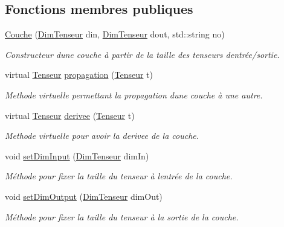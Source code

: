 \subsection*{Fonctions membres publiques}
\begin{DoxyCompactItemize}
\item 
\mbox{\label{class_couche_a6da95828f8c597f57aaac057b9357622}} 
\hyperlink{class_couche_a6da95828f8c597f57aaac057b9357622}{Couche} (\hyperlink{class_dim_tenseur}{Dim\+Tenseur} din, \hyperlink{class_dim_tenseur}{Dim\+Tenseur} dout, std\+::string no)
\begin{DoxyCompactList}\small\item\em Constructeur d\textquotesingle{}une couche à partir de la taille des tenseurs d\textquotesingle{}entrée/sortie. \end{DoxyCompactList}\item 
virtual \hyperlink{class_tenseur}{Tenseur} \hyperlink{class_couche_a1f0ed59e21020f5d4f37933af4d1b1e5}{propagation} (\hyperlink{class_tenseur}{Tenseur} t)
\begin{DoxyCompactList}\small\item\em Methode virtuelle permettant la propagation d\textquotesingle{}une couche à une autre. \end{DoxyCompactList}\item 
virtual \hyperlink{class_tenseur}{Tenseur} \hyperlink{class_couche_acfb65d035c2070d65b699508b7333bb3}{derivee} (\hyperlink{class_tenseur}{Tenseur} t)
\begin{DoxyCompactList}\small\item\em Methode virtuelle pour avoir la derivee de la couche. \end{DoxyCompactList}\item 
void \hyperlink{class_couche_ab24ce01bc6fb7b903013f7682ce60a7e}{set\+Dim\+Input} (\hyperlink{class_dim_tenseur}{Dim\+Tenseur} dim\+In)
\begin{DoxyCompactList}\small\item\em Méthode pour fixer la taille du tenseur à l\textquotesingle{}entrée de la couche. \end{DoxyCompactList}\item 
void \hyperlink{class_couche_a9af2f37eaf1063cb05abe980cfaa4cce}{set\+Dim\+Output} (\hyperlink{class_dim_tenseur}{Dim\+Tenseur} dim\+Out)
\begin{DoxyCompactList}\small\item\em Méthode pour fixer la taille du tenseur à la sortie de la couche. \end{DoxyCompactList}\item 

\end{DoxyCompactItemize}
